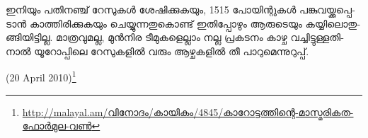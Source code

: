 ഇ­നി­യും പതി­ന­ഞ്ച് റേ­സു­കള്‍ ശേ­ഷി­ക്കു­ക­യും, 1515 പോ­യി­ന്റു­കള്‍ പങ്കു­വ­യ്ക്ക­പ്പെ­ടാന്‍ കാ­ത്തി­രി­ക്കു­ക­യും ചെ­യ്യു­ന്ന­തു­കൊ­ണ്ട് 
ഇതി­പ്പോ­ഴും ആരു­ടെ­യും കയ്യി­ലൊ­തു­ങ്ങി­യി­ട്ടി­ല്ല. മാ­ത്ര­വു­മ­ല്ല, മുന്‍­നിര ടീ­മു­ക­ളെ­ല്ലാം നല്ല പ്ര­ക­ട­നം കാ­ഴ്ച വച്ചി­ട്ടു­ള്ള­തി­നാല്‍ 
യൂ­റോ­പ്പി­ലെ റേ­സു­ക­ളില്‍ വരും ആഴ്ച­ക­ളില്‍ തീ പാ­റു­മെ­ന്നു­റു­പ്പ്. 

(20 April 2010)\footnote{\url{http://malayal.am/വിനോദം/കായികം/4845/കാറോട്ടത്തിന്റെ-മാസ്മരികത-ഫോര്‍മുല-വണ്‍}}

\newpage
